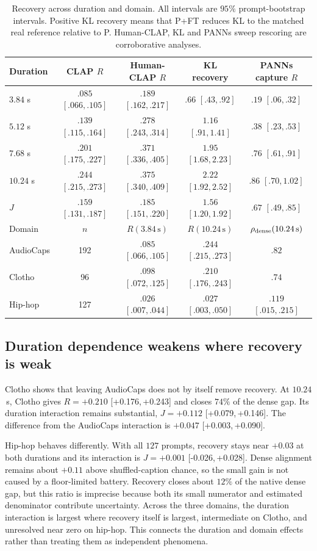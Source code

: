 \documentclass{article}
\newcommand{\ci}[2]{[{#1},\,{#2}]}
\newcommand{\PFT}{P{+}FT}
\begin{document}
\begin{table}[t]
\centering
\caption{Recovery across duration and domain. All intervals are $95\%$ prompt-bootstrap intervals. Positive KL recovery means that \PFT{} reduces KL to the matched real reference relative to P. Human-CLAP, KL and PANNs sweep rescoring are corroborative analyses.}
\label{tab:evidence}
\setlength{\tabcolsep}{4.0pt}
\begin{tabular}{@{}lcccc@{}}
\toprule
Duration & CLAP $R$ & Human-CLAP $R$ & KL recovery & PANNs capture $R$ \\
\midrule
$3.84$ s & $.085$ $[.066,.105]$ & $.189$ $[.162,.217]$ & $.66$ $[.43,.92]$ & $.19$ $[.06,.32]$ \\
$5.12$ s & $.139$ $[.115,.164]$ & $.278$ $[.243,.314]$ & $1.16$ $[.91,1.41]$ & $.38$ $[.23,.53]$ \\
$7.68$ s & $.201$ $[.175,.227]$ & $.371$ $[.336,.405]$ & $1.95$ $[1.68,2.23]$ & $.76$ $[.61,.91]$ \\
$10.24$ s & $.244$ $[.215,.273]$ & $.375$ $[.340,.409]$ & $2.22$ $[1.92,2.52]$ & $.86$ $[.70,1.02]$ \\
$J$ & $.159$ $[.131,.187]$ & $.185$ $[.151,.220]$ & $1.56$ $[1.20,1.92]$ & $.67$ $[.49,.85]$ \\
\midrule
Domain & $n$ & $R(3.84\,\mathrm{s})$ & $R(10.24\,\mathrm{s})$ & $\rho_{\rm dense}(10.24\,\mathrm{s})$ \\
\midrule
AudioCaps & 192 & $.085$ $[.066,.105]$ & $.244$ $[.215,.273]$ & $.82$ \\
Clotho & 96 & $.098$ $[.072,.125]$ & $.210$ $[.176,.243]$ & $.74$ \\
Hip-hop & 127 & $.026$ $[.007,.044]$ & $.027$ $[.003,.050]$ & $.119$ $[.015,.215]$ \\
\bottomrule
\end{tabular}
\end{table}

\subsection{Duration dependence weakens where recovery is weak}
Clotho shows that leaving AudioCaps does not by itself remove recovery. At $10.24$\,s, Clotho gives $R=+0.210$ \ci{+0.176}{+0.243} and closes $74\%$ of the dense gap. Its duration interaction remains substantial, $J=+0.112$ \ci{+0.079}{+0.146}. The difference from the AudioCaps interaction is $+0.047$ \ci{+0.003}{+0.090}.

Hip-hop behaves differently. With all $127$ prompts, recovery stays near $+0.03$ at both durations and its interaction is $J=+0.001$ \ci{-0.026}{+0.028}. Dense alignment remains about $+0.11$ above shuffled-caption chance, so the small gain is not caused by a floor-limited battery. Recovery closes about $12\%$ of the native dense gap, but this ratio is imprecise because both its small numerator and estimated denominator contribute uncertainty. Across the three domains, the duration interaction is largest where recovery itself is largest, intermediate on Clotho, and unresolved near zero on hip-hop. This connects the duration and domain effects rather than treating them as independent phenomena.
\end{document}
